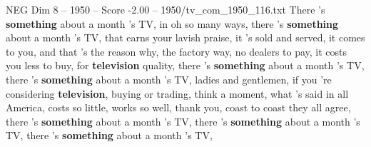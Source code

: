 \begin{textsample}{NEG Dim 8 – 1950 – Score -2.00 – 1950/tv\_com\_1950\_116.txt}  \label{ex:f8_neg_088}
There 's \textbf{something} about a month 's TV, in oh so many ways, there 's \textbf{something} about a month 's TV, that earns your lavish praise, it 's sold and served, it comes to you, and that 's the reason why, the factory way, no dealers to pay, it costs you less to buy, for \textbf{television} quality, there 's \textbf{something} about a month 's TV, there 's \textbf{something} about a month 's TV, ladies and gentlemen, if you 're considering \textbf{television}, buying or trading, think a moment, what 's said in all America, costs so little, works so well, thank you, coast to coast they all agree, there 's \textbf{something} about a month 's TV, there 's \textbf{something} about a month 's TV, there 's \textbf{something} about a month 's TV,

\end{textsample}

